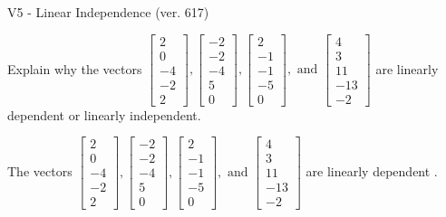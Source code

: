 \begin{exercise}
  \begin{exerciseTitle}V5 - Linear Independence (ver. 617)\end{exerciseTitle}
  \begin{exerciseStatement}
    Explain why the vectors \(\left[\begin{array}{r}
2 \\
0 \\
-4 \\
-2 \\
2
\end{array}\right] , \left[\begin{array}{r}
-2 \\
-2 \\
-4 \\
5 \\
0
\end{array}\right] , \left[\begin{array}{r}
2 \\
-1 \\
-1 \\
-5 \\
0
\end{array}\right] , \text{ and } \left[\begin{array}{r}
4 \\
3 \\
11 \\
-13 \\
-2
\end{array}\right]\) are linearly dependent or linearly independent.	


  \end{exerciseStatement}
  \begin{exerciseAnswer}
   The vectors \(\left[\begin{array}{r}
2 \\
0 \\
-4 \\
-2 \\
2
\end{array}\right] , \left[\begin{array}{r}
-2 \\
-2 \\
-4 \\
5 \\
0
\end{array}\right] , \left[\begin{array}{r}
2 \\
-1 \\
-1 \\
-5 \\
0
\end{array}\right] , \text{ and } \left[\begin{array}{r}
4 \\
3 \\
11 \\
-13 \\
-2
\end{array}\right]\) are 
  	 linearly dependent  .
  


  \end{exerciseAnswer}
\end{exercise}